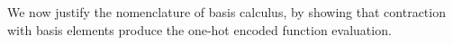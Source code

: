 %
%




We now justify the nomenclature of basis calculus, by showing that contraction with basis elements produce the one-hot encoded function evaluation.

